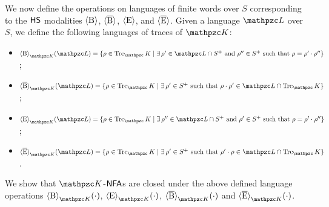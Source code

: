 We now define the operations on languages of  finite words over $S$ corresponding to the $\text{\sffamily HS}$ modalities $\operatorname{\langle B\rangle}$, $\operatorname{\langle \overline{B}\rangle}$, $\operatorname{\langle E\rangle}$, and $\operatorname{\langle \overline{E}\rangle}$.
Given a language $\Lang$ over $S$, we define the following languages of traces of $\Ku$:
%
%
%
\begin{itemize}
 \item   $\hsB_{\Ku}(\Lang) = \{ \rho\in\Trk_\Ku\mid  \exists\, \rho'\in \Lang\cap S^{+} \text{ and }\rho''\in S^{+} \text{ such that } \rho= \rho'\cdot \rho'' \}$;
 \item   $\hsBt_{\Ku}(\Lang) =\{ \rho\in \Trk_\Ku\mid \exists\, \rho'\in S^{+}\text{ such that }\rho\cdot \rho'\in\Lang\cap \Trk_\Ku \}$;
  \item   $\hsE_{\Ku}(\Lang) =\{ \rho\in\Trk_\Ku\mid \exists\, \rho''\in \Lang\cap S^{+} \text{ and } \rho'\in S^{+} \text{ such that } \rho= \rho'\cdot \rho''  \}$;
 \item   $\hsEt_{\Ku}(\Lang) = \{ \rho\in\Trk_\Ku\mid \exists\, \rho'\in S^{+}\text{ such that } \rho'\cdot \rho\in\Lang\cap \Trk_\Ku \}$.
\end{itemize}

We show that $\Ku$-$\text{\sffamily NFA}$s are closed under the above defined language operations $\hsB_{\Ku}(\cdot)$, $\hsE_{\Ku}(\cdot)$, $\hsBt_{\Ku}(\cdot)$ and $\hsEt_{\Ku}(\cdot)$.

